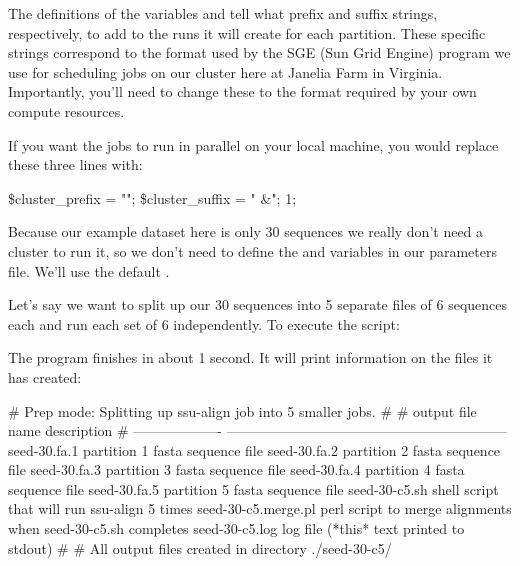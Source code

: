 The definitions of the variables  and
 tell  what prefix and suffix
strings, respectively, to add to the  runs it will
create for each partition. These specific strings correspond to the
format used by the SGE (Sun Grid Engine)  program we use
for scheduling jobs on our cluster here at Janelia Farm in Virginia.
Importantly, you'll need to change these to the format required by
your own compute resources.

If you want the jobs to run in parallel on your local machine, you
would replace these three lines with:
\begin{sreoutput}
\$cluster_prefix = "";
\$cluster_suffix = " &";
1;
\end{sreoutput}

Because our example dataset here is only 30 sequences we really don't
need a cluster to run it, so we don't need to define the
 and  variables in our
parameters file. We'll use the default .

Let's say we want to split up our 30 sequences into 5 separate files
of 6 sequences each and run each set of 6 independently. 
To execute the script:


The program finishes in about 1 second. It will print information on
the files it has created:

\newpage

\begin{comment}
# ssu-align :: define and align SSU rRNA sequences
# SSU-ALIGN 0.1 (June 2009)
# Copyright (C) 2009 HHMI Janelia Farm Research Campus
# Freely distributed under the GNU General Public License (GPLv3)
# - - - - - - - - - - - - - - - - - - - - - - - - - - - - - - - - - - - -
# command: ssu-align -c 5 ssu3-0p1.cm seed-30.fa seed-30-c5 sa-0p1.params
# date:    Wed Aug 19 18:57:15 2009
#
\end{comment}
\begin{sreoutput}
# Prep mode: Splitting up ssu-align job into 5 smaller jobs.
#
# output file name     description                                                 
# -------------------  ------------------------------------------------------------
  seed-30.fa.1         partition 1 fasta sequence file
  seed-30.fa.2         partition 2 fasta sequence file
  seed-30.fa.3         partition 3 fasta sequence file
  seed-30.fa.4         partition 4 fasta sequence file
  seed-30.fa.5         partition 5 fasta sequence file
  seed-30-c5.sh        shell script that will run ssu-align 5 times
  seed-30-c5.merge.pl  perl script to merge alignments when seed-30-c5.sh completes
  seed-30-c5.log       log file (*this* text printed to stdout)
#
# All output files created in directory ./seed-30-c5/
\end{sreoutput}

